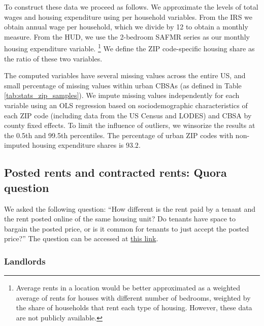 To construct these data we proceed as follows.
We approximate the levels of total wages and housing expenditure using per 
household variables.
From the IRS we obtain annual wage per household, which we 
divide by 12 to obtain a monthly measure.
From the HUD, we use the 2-bedroom SAFMR series as our monthly housing 
expenditure variable.%
\footnote{Average rents in a location would be better approximated as a
weighted average of rents for houses with different number of bedrooms,
weighted by the share of households that rent each type of housing.
However, these data are not publicly available.}
We define the ZIP code-specific housing share as the ratio of these two 
variables.

The computed variables have several missing values across the entire US, and 
small percentage of missing values within urban CBSAs 
(as defined in Table \ref{tab:stats_zip_samples}).
We impute missing values independently for each variable using an OLS
regression based on sociodemographic characteristics of each ZIP code 
(including data from the US Census and LODES) and CBSA by county fixed effects.
To limit the influence of outliers, we winsorize the results at the 0.5th and 
99.5th percentiles. 
The percentage of urban ZIP codes with non-imputed housing expenditure shares 
is $93.2$.
%
%

\subsection{Posted rents and contracted rents: Quora question}
\label{sec:posted_rents}
	
We asked the following question: ``How different is the rent paid by a tenant 
and the rent posted online of the same housing unit? Do tenants have space 
to bargain the posted price, or is it common for tenants to just accept the
posted price?''
The question can be accessed at
\href{https://www.quora.com/How-different-is-the-rent-paid-by-a-tenant-and-the-rent-posted-online-of-the-same-housing-unit-Do-tenants-have-space-to-bargain-the-posted-price-or-is-it-common-for-tenants-to-just-accept-the-posted-price}{this link}.
		
\subsubsection*{Landlords}

